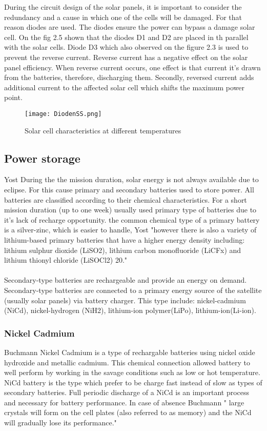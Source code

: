 During the circuit design of the solar panels, it is important to consider the redundancy and a cause in which one of the cells will be damaged. For that reason diodes are used. The diodes ensure the power can bypass a damage solar cell. On the fig 2.5 shown that the diodes D1 and D2 are placed in th parallel with the solar cells. Diode D3 which also observed on the figure 2.3 is used to prevent the reverse current. Reverse current has a negative effect on the solar panel efficiency. When reverse current occurs, one effect is that current it's drawn from the batteries, therefore, discharging them. Secondly, reversed current adds additional current to the affected solar cell which shifts the maximum power point.\\


\begin{figure}[h]
	\centering
	\texttt{[image: DiodenSS.png]}
	\caption{ Solar cell characteristics at different temperatures}
	\label{fig: EPS}
\end{figure}
 
\newpage


\subsection{Power storage \label{sec:tech}}



Yost\cite{1} During the the mission duration, solar energy is not always available due to eclipse. For this cause primary and secondary batteries used to store power. All batteries are classified according to their chemical characteristics. For a short mission duration (up to one week) usually used primary type of batteries due to it's lack of recharge opportunity. the common chemical type of a primary battery is a silver-zinc, which is easier to handle, Yost\cite{1} "however there is also a variety of lithium-based primary batteries that have a higher energy density including: lithium sulphur dioxide (LiSO2), lithium carbon monofluoride (LiCFx) and lithium thionyl chloride (LiSOCl2) 20."\\
\\
Secondary-type batteries are rechargeable and provide an energy on demand. Secondary-type batteries are connected to a primary energy source of the satellite (usually solar panels) via battery charger. This type include: nickel-cadmium (NiCd), nickel-hydrogen (NiH2), lithium-ion polymer(LiPo), lithium-ion(Li-ion).
\subsubsection{Nickel Cadmium \label{sec:tech}}
 Buchmann\cite{7} Nickel Cadmium is a type of rechargable batteries using nickel oxide hydroxide and metallic cadmium. This chemical connection allowed battery to well perform by working in the savage conditions such as low or hot temperature. NiCd battery is the type which prefer to be charge fast instead of slow as types of secondary batteries. Full periodic discharge of a NiCd is an important process and necessary for battery performance. In case of absence  Buchmann\cite{7} " large crystals will form on the cell plates (also referred to as memory) and the NiCd will gradually lose its performance."
 
